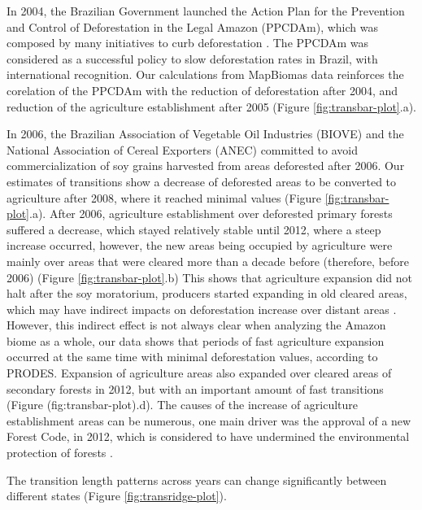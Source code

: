 \documentclass[essd, manuscript]{copernicus}
\begin{document}
In 2004, the Brazilian Government launched the Action Plan for the Prevention and Control of Deforestation in the Legal Amazon (PPCDAm), which was composed by many initiatives to curb deforestation \citep{West2021}.
The PPCDAm was considered as a successful policy to slow deforestation rates in Brazil, with international recognition.
Our calculations from MapBiomas data reinforces the corelation of the PPCDAm with the reduction of deforestation after 2004, and reduction of the agriculture establishment after 2005 (Figure \ref{fig:transbar-plot}.a).

In 2006, the Brazilian Association of Vegetable Oil Industries (BIOVE) and the National Association of Cereal Exporters (ANEC) committed to avoid commercialization of soy grains harvested from areas deforested after 2006.
Our estimates of transitions show a decrease of deforested areas to be converted to agriculture after 2008, where it reached minimal values (Figure \ref{fig:transbar-plot}.a).
After 2006, agriculture establishment over deforested primary forests suffered a decrease, which stayed relatively stable until 2012, where a steep increase occurred, however, the new areas being occupied by agriculture were mainly over areas that were cleared more than a decade before (therefore, before 2006) (Figure \ref{fig:transbar-plot}.b) This shows that agriculture expansion did not halt after the soy moratorium, producers started expanding in old cleared areas, which may have indirect impacts on deforestation increase over distant areas \citep{Arima2011}. However, this indirect effect is not always clear when analyzing the Amazon biome as a whole, our data shows that periods of fast agriculture expansion occurred at the same time with minimal deforestation values, according to PRODES. Expansion of agriculture areas also expanded over cleared areas of secondary forests in 2012, but with an important amount of fast transitions (Figure \citet{ref}(fig:transbar-plot).d). The causes of the increase of agriculture establishment areas can be numerous, one main driver was the approval of a new Forest Code, in 2012, which is considered to have undermined the environmental protection of forests \citep{Kroger2017, Pereira2019}.

The transition length patterns across years can change significantly between different states (Figure \ref{fig:transridge-plot}).
\end{document}
